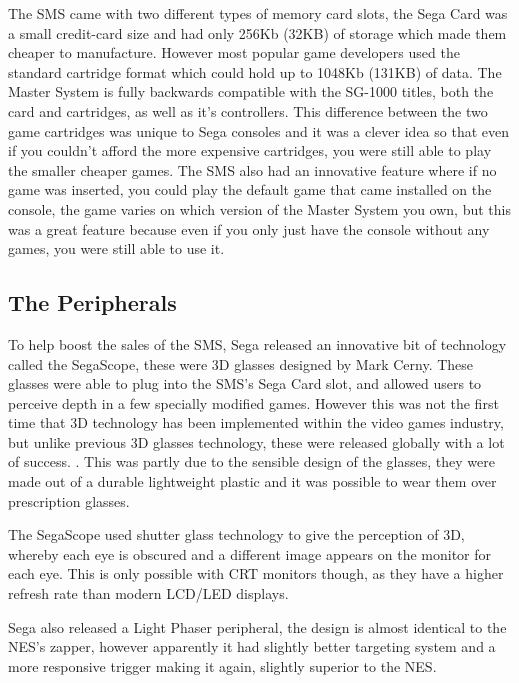 \documentclass{scrartcl}
\begin{document}
The SMS came with two different types of memory card slots, the Sega Card was a small credit-card size and had only 256Kb (32KB) of storage which made them cheaper to manufacture. However most popular game developers used the standard cartridge format which could hold up to 1048Kb (131KB) of data. \cite{Weiss2009} The Master System is fully backwards compatible with the SG-1000 titles, both the card and cartridges, as well as it's controllers. \cite{racket} This difference between the two game cartridges was unique to Sega consoles and it was a clever idea so that even if you couldn't afford the more expensive cartridges, you were still able to play the smaller cheaper games. The SMS also had an innovative feature where if no game was inserted, you could play the default game that came installed on the console, the game varies on which version of the Master System you own, but this was a great feature because even if you only just have the console without any games, you were still able to use it.


\subsection{The Peripherals}

To help boost the sales of the SMS, Sega released an innovative bit of technology called the SegaScope, these were 3D glasses designed by Mark Cerny. \cite{Kent2001}  These glasses were able to plug into the SMS's Sega Card slot, and allowed users to perceive depth in a few specially modified games. However this was not the first time that 3D technology has been implemented within the video games industry\cite{Edwards}, but unlike previous 3D glasses technology, these were released globally with a lot of success. \cite{Workman}. This was partly due to the sensible design of the glasses, they were made out of a durable lightweight plastic and it was possible to wear them over prescription glasses. \cite{Kent2001}

The SegaScope used shutter glass technology to give the perception of 3D, whereby each eye is obscured and a different image appears on the monitor for each eye. This is only possible with CRT monitors though, as they have a higher refresh rate than modern LCD/LED displays.\cite{Cohen}

Sega also released a Light Phaser peripheral, the design is almost identical to the NES's zapper, however apparently it had slightly better targeting system and a more responsive trigger making it again, slightly superior to the NES.\cite{Weiss2009}
\end{document}
